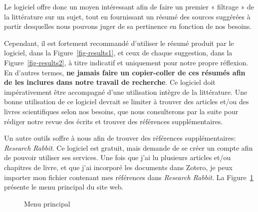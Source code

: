 \documentclass[
  letterpaper,
  DIV=11,
  numbers=noendperiod]{scrreprt}
\begin{document}
Le logiciel offre donc un moyen intéressant afin de faire un premier «
filtrage » de la littérature sur un sujet, tout en fournissant un résumé
des sources suggérées à partir desquelles nous pouvons juger de sa
pertinence en fonction de nos besoins.

Cependant, il est fortement recommandé d'utiliser le résumé produit par
le logiciel, dans la Figure~\ref{fig-results1}, et ceux de chaque
suggestion, dans la Figure~\ref{fig-results2}, à titre indicatif et
uniquement pour notre propre réflexion. En d'autres termes, \textbf{ne
jamais faire un copier-coller de ces résumés afin de les inclures dans
notre travail de recherche}. Ce logiciel doit impérativement être
accompagné d'une utilisation intègre de la littérature. Une bonne
utilisation de ce logiciel devrait se limiter à trouver des articles
et/ou des livres scientifiques selon nos besoins, que nous consulterons
par la suite pour rédiger notre revue des écrits et trouver des
références supplémentaires.

Un autre outils soffre à nous afin de trouver des références
supplémentaires: \emph{Research Rabbit}. Ce logiciel est gratuit, mais
demande de se créer un compte afin de pouvoir utiliser ses services. Une
fois que j'ai lu plusieurs articles et/ou chapitres de livre, et que
j'ai incorporé les documents dans Zotero, je peux importer mon fichier
contenant mes références dans \emph{Research Rabbit}. La
Figure~\ref{fig-rr1} présente le menu principal du site web.

\begin{figure}


\caption{\label{fig-rr1}Menu principal}

\end{figure}%
\end{document}
